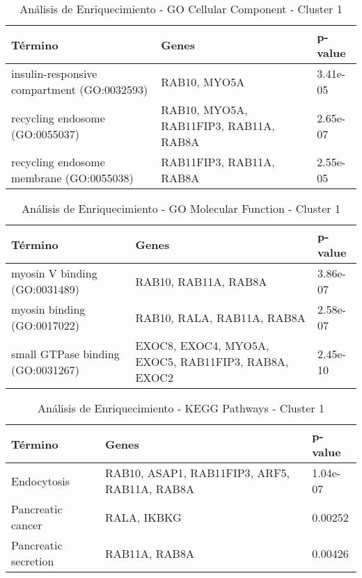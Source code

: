 \begin{table}[ht]
	\centering
	\caption{Análisis de Enriquecimiento - GO Cellular Component - Cluster 1}
	\begin{tabularx}{\textwidth}{|l|X|l|}
		\hline
		\textbf{Término} & \textbf{Genes} & \textbf{p-value} \\ \hline
		insulin-responsive compartment (GO:0032593) & RAB10, MYO5A & 3.41e-05 \\ \hline
		recycling endosome (GO:0055037) & RAB10, MYO5A, RAB11FIP3, RAB11A, RAB8A & 2.65e-07 \\ \hline
		recycling endosome membrane (GO:0055038) & RAB11FIP3, RAB11A, RAB8A & 2.55e-05 \\ \hline
	\end{tabularx}
\end{table}

\begin{table}[ht]
	\centering
	\caption{Análisis de Enriquecimiento - GO Molecular Function - Cluster 1}
	\begin{tabularx}{\textwidth}{|l|X|l|}
		\hline
		\textbf{Término} & \textbf{Genes} & \textbf{p-value} \\ \hline
		myosin V binding (GO:0031489) & RAB10, RAB11A, RAB8A & 3.86e-07 \\ \hline
		myosin binding (GO:0017022) & RAB10, RALA, RAB11A, RAB8A & 2.58e-07 \\ \hline
		small GTPase binding (GO:0031267) & EXOC8, EXOC4, MYO5A, EXOC5, RAB11FIP3, RAB8A, EXOC2 & 2.45e-10 \\ \hline
	\end{tabularx}
\end{table}

\begin{table}[ht]
	\centering
	\caption{Análisis de Enriquecimiento - KEGG Pathways - Cluster 1}
	\begin{tabularx}{\textwidth}{|l|X|l|}
		\hline
		\textbf{Término} & \textbf{Genes} & \textbf{p-value} \\ \hline
		Endocytosis & RAB10, ASAP1, RAB11FIP3, ARF5, RAB11A, RAB8A & 1.04e-07 \\ \hline
		Pancreatic cancer & RALA, IKBKG & 0.00252 \\ \hline
		Pancreatic secretion & RAB11A, RAB8A & 0.00426 \\ \hline
	\end{tabularx}
\end{table}


